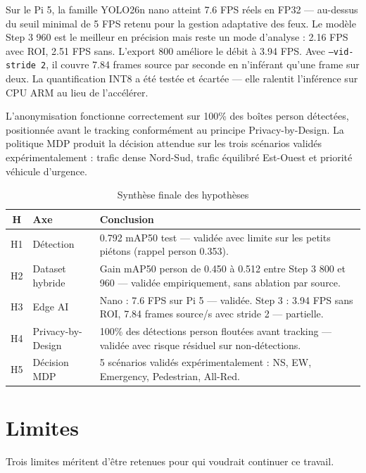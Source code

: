 Sur le Pi 5, la famille YOLO26n nano atteint
7.6 FPS réels en FP32 — au-dessus du seuil
minimal de 5 FPS retenu pour la gestion
adaptative des feux. Le modèle Step 3 960
est le meilleur en précision mais reste
un mode d'analyse : 2.16 FPS avec ROI,
2.51 FPS sans. L'export 800 améliore le
débit à 3.94 FPS. Avec \texttt{--vid-stride 2},
il couvre 7.84 frames source par seconde
en n'inférant qu'une frame sur deux. La
quantification INT8 a été testée et écartée
— elle ralentit l'inférence sur CPU ARM
au lieu de l'accélérer.

L'anonymisation fonctionne correctement
sur 100\% des boîtes person détectées,
positionnée avant le tracking conformément
au principe Privacy-by-Design. La politique
MDP produit la décision attendue sur les
trois scénarios validés expérimentalement :
trafic dense Nord-Sud, trafic équilibré
Est-Ouest et priorité véhicule d'urgence.

\begin{table}[H]
\centering
\caption{Synthèse finale des hypothèses}
\small
\begin{tabularx}{\textwidth}{clX}
\toprule
\textbf{H} &
\textbf{Axe} &
\textbf{Conclusion} \\
\midrule
H1 & Détection &
0.792 mAP50 test — validée avec
limite sur les petits piétons
(rappel person 0.353). \\
H2 & Dataset hybride &
Gain mAP50 person de 0.450 à 0.512
entre Step 3 800 et 960 — validée
empiriquement, sans ablation par source. \\
H3 & Edge AI &
Nano : 7.6 FPS sur Pi 5 — validée.
Step 3 : 3.94 FPS sans ROI, 7.84 frames
source/s avec stride 2 — partielle. \\
H4 & Privacy-by-Design &
100\% des détections person floutées
avant tracking — validée avec risque
résiduel sur non-détections. \\
H5 & Décision MDP &
5 scénarios validés expérimentalement :
NS, EW, Emergency, Pedestrian, All-Red. \\
\bottomrule
\end{tabularx}
\label{tab:conclusion_hypotheses}
\end{table}

\section*{Limites}
{}

Trois limites méritent d'être retenues
pour qui voudrait continuer ce travail.

